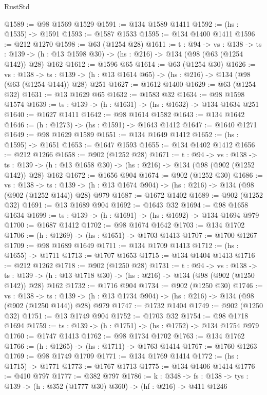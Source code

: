 \begin{lexlean}{RustStd}
\begin{coremodule}
{\begin{coremodule}
{{{{{{{{@1589 := @98 @1569 @1529
@1591 := @134 @1589 @1411
@1592 := (hs : @1535) -> @1591
@1593 := @1587 @1533
@1595 := @134 @1400 @1411
@1596 := @212 @1270
@1598 := @63 (@1254 @28)
@1611 := {t : @94} ->
  {vs : @138} ->
  {ts : @139} -> (h : @13 @1598 @30) -> (hs : @216) -> @134 (@98 (@63 (@1254 @142)) @28) @162
@1612 := @1596 @65
@1614 := @63 (@1254 @30)
@1626 := {vs : @138} ->
  {ts : @139} -> (h : @13 @1614 @65) -> (hs : @216) -> @134 (@98 (@63 (@1254 @144)) @28) @251
@1627 := @1612 @1400
@1629 := @63 (@1254 @32)
@1631 := @13 @1629 @65
@1632 := @1583 @32
@1634 := @98 @1598 @1574
@1639 := {ts : @139} -> (h : @1631) -> (hs : @1632) -> @134 @1634 @251
@1640 := @1627 @1411
@1642 := @98 @1614 @1582
@1643 := @134 @1642
@1646 := (h : @1273) -> (hs : @1591) -> @1643 @1412
@1647 := @1640 @1271
@1649 := @98 @1629 @1589
@1651 := @134 @1649 @1412
@1652 := (hs : @1595) -> @1651
@1653 := @1647 @1593
@1655 := @134 @1402 @1412
@1656 := @212 @1266
@1658 := @902 (@1252 @28)
@1671 := {t : @94} ->
  {vs : @138} ->
  {ts : @139} -> (h : @13 @1658 @30) -> (hs : @216) -> @134 (@98 (@902 (@1252 @142)) @28) @162
@1672 := @1656 @904
@1674 := @902 (@1252 @30)
@1686 := {vs : @138} ->
  {ts : @139} -> (h : @13 @1674 @904) -> (hs : @216) -> @134 (@98 (@902 (@1252 @144)) @28) @979
@1687 := @1672 @1402
@1689 := @902 (@1252 @32)
@1691 := @13 @1689 @904
@1692 := @1643 @32
@1694 := @98 @1658 @1634
@1699 := {ts : @139} -> (h : @1691) -> (hs : @1692) -> @134 @1694 @979
@1700 := @1687 @1412
@1702 := @98 @1674 @1642
@1703 := @134 @1702
@1706 := (h : @1269) -> (hs : @1651) -> @1703 @1413
@1707 := @1700 @1267
@1709 := @98 @1689 @1649
@1711 := @134 @1709 @1413
@1712 := (hs : @1655) -> @1711
@1713 := @1707 @1653
@1715 := @134 @1404 @1413
@1716 := @212 @1262
@1718 := @902 (@1250 @28)
@1731 := {t : @94} ->
  {vs : @138} ->
  {ts : @139} -> (h : @13 @1718 @30) -> (hs : @216) -> @134 (@98 (@902 (@1250 @142)) @28) @162
@1732 := @1716 @904
@1734 := @902 (@1250 @30)
@1746 := {vs : @138} ->
  {ts : @139} -> (h : @13 @1734 @904) -> (hs : @216) -> @134 (@98 (@902 (@1250 @144)) @28) @979
@1747 := @1732 @1404
@1749 := @902 (@1250 @32)
@1751 := @13 @1749 @904
@1752 := @1703 @32
@1754 := @98 @1718 @1694
@1759 := {ts : @139} -> (h : @1751) -> (hs : @1752) -> @134 @1754 @979
@1760 := @1747 @1413
@1762 := @98 @1734 @1702
@1763 := @134 @1762
@1766 := (h : @1265) -> (hs : @1711) -> @1763 @1414
@1767 := @1760 @1263
@1769 := @98 @1749 @1709
@1771 := @134 @1769 @1414
@1772 := (hs : @1715) -> @1771
@1773 := @1767 @1713
@1775 := @134 @1406 @1414
@1776 := @410 @797
@1777 := @382 @797
@1786 := {k : @348} ->
  {fs : @138} -> {tys : @139} -> (h : @352 (@1777 @30) @360) -> (hf : @216) -> @411 @1246
}}}}}}}}
\end{coremodule}}
\end{coremodule}
\end{lexlean}
